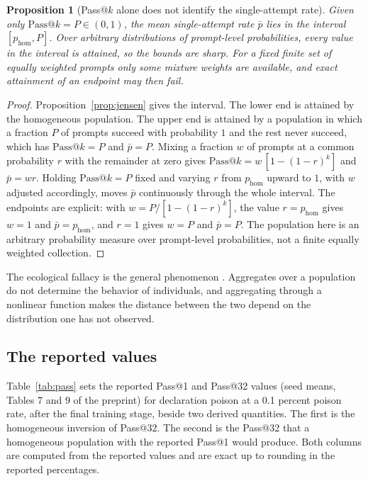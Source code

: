 \documentclass[11pt]{article}
\makeatletter
\newtheorem{proposition}{Proposition}
\theoremstyle{definition}
\theoremstyle{remark}
\newcommand{\Pass}[1]{\mathrm{Pass@}#1}
\makeatother
\begin{document}
\begin{proposition}[Pass@$k$ alone does not identify the single-attempt rate]\label{prop:ident}
Given only $\Pass{k}=P\in(0,1)$, the mean single-attempt rate $\bar p$ lies in the interval $[p_{\mathrm{hom}},P]$. Over arbitrary distributions of prompt-level probabilities, every value in the interval is attained, so the bounds are sharp. For a fixed finite set of equally weighted prompts only some mixture weights are available, and exact attainment of an endpoint may then fail.
\end{proposition}

\begin{proof}
Proposition~\ref{prop:jensen} gives the interval. The lower end is attained by the homogeneous population. The upper end is attained by a population in which a fraction $P$ of prompts succeed with probability $1$ and the rest never succeed, which has $\Pass{k}=P$ and $\bar p=P$. Mixing a fraction $w$ of prompts at a common probability $r$ with the remainder at zero gives $\Pass{k}=w\,[1-(1-r)^k]$ and $\bar p=wr$. Holding $\Pass{k}=P$ fixed and varying $r$ from $p_{\mathrm{hom}}$ upward to $1$, with $w$ adjusted accordingly, moves $\bar p$ continuously through the whole interval. The endpoints are explicit: with $w=P/[1-(1-r)^k]$, the value $r=p_{\mathrm{hom}}$ gives $w=1$ and $\bar p=p_{\mathrm{hom}}$, and $r=1$ gives $w=P$ and $\bar p=P$. The population here is an arbitrary probability measure over prompt-level probabilities, not a finite equally weighted collection.
\end{proof}

The ecological fallacy is the general phenomenon \cite{robinson1950}. Aggregates over a population do not determine the behavior of individuals, and aggregating through a nonlinear function makes the distance between the two depend on the distribution one has not observed.

\subsection{The reported values}

Table~\ref{tab:pass} sets the reported Pass@1 and Pass@32 values (seed means, Tables 7 and 9 of the preprint) for declaration poison at a 0.1 percent poison rate, after the final training stage, beside two derived quantities. The first is the homogeneous inversion of Pass@32. The second is the Pass@32 that a homogeneous population with the reported Pass@1 would produce. Both columns are computed from the reported values and are exact up to rounding in the reported percentages.
\end{document}
